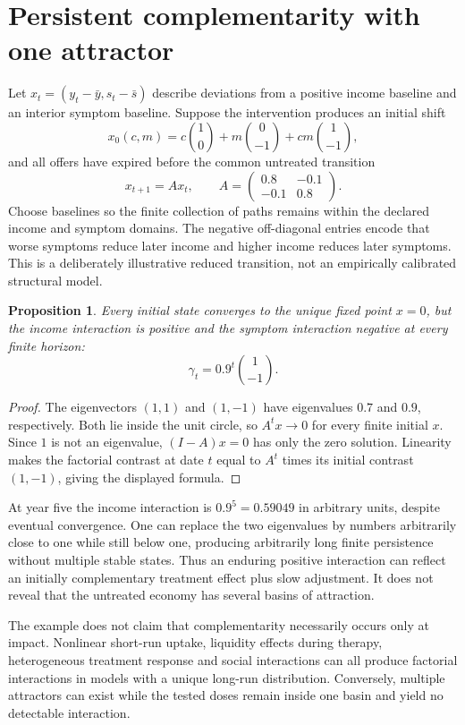 \documentclass[11pt,a4paper]{article}
\newtheorem{proposition}[theorem]{Proposition}
\begin{document}
\section{Persistent complementarity with one attractor}
Let $x_t=(y_t-\bar y,s_t-\bar s)$ describe deviations from a positive income baseline and an interior symptom baseline. Suppose the intervention produces an initial shift
\[
 x_0(c,m)=c\binom10+m\binom0{-1}+cm\binom1{-1},
\]
and all offers have expired before the common untreated transition
\[
 x_{t+1}=Ax_t,\qquad
 A=\begin{pmatrix}0.8&-0.1\\-0.1&0.8\end{pmatrix}.
\tag{1}
\]
Choose baselines so the finite collection of paths remains within the declared income and symptom domains. The negative off-diagonal entries encode that worse symptoms reduce later income and higher income reduces later symptoms. This is a deliberately illustrative reduced transition, not an empirically calibrated structural model.
\begin{proposition}
Every initial state converges to the unique fixed point $x=0$, but the income interaction is positive and the symptom interaction negative at every finite horizon:
\[
 \gamma_t=0.9^t\binom1{-1}.
\]
\end{proposition}
\begin{proof}
The eigenvectors $(1,1)$ and $(1,-1)$ have eigenvalues $0.7$ and $0.9$, respectively. Both lie inside the unit circle, so $A^tx\to0$ for every finite initial $x$. Since $1$ is not an eigenvalue, $(I-A)x=0$ has only the zero solution. Linearity makes the factorial contrast at date $t$ equal to $A^t$ times its initial contrast $(1,-1)$, giving the displayed formula.
\end{proof}
At year five the income interaction is $0.9^5=0.59049$ in arbitrary units, despite eventual convergence. One can replace the two eigenvalues by numbers arbitrarily close to one while still below one, producing arbitrarily long finite persistence without multiple stable states. Thus an enduring positive interaction can reflect an initially complementary treatment effect plus slow adjustment. It does not reveal that the untreated economy has several basins of attraction.

The example does not claim that complementarity necessarily occurs only at impact. Nonlinear short-run uptake, liquidity effects during therapy, heterogeneous treatment response and social interactions can all produce factorial interactions in models with a unique long-run distribution. Conversely, multiple attractors can exist while the tested doses remain inside one basin and yield no detectable interaction.
\end{document}

